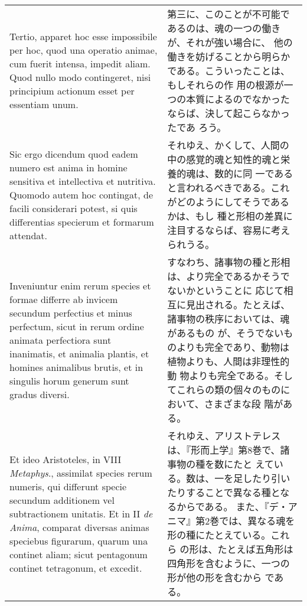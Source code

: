 \documentclass[paper=a4paper,fontsize=10pt,jafontsize=9pt,titlepage]{jlreq}
\begin{document}
\begin{longtable}{p{21em}p{21em}}
\\

Tertio, apparet hoc esse impossibile per hoc, quod una operatio
animae, cum fuerit intensa, impedit aliam. Quod nullo modo
contingeret, nisi principium actionum esset per essentiam unum.

&

第三に、このことが不可能であるのは、魂の一つの働きが、それが強い場合に、
他の働きを妨げることから明らかである。こういったことは、もしそれらの作
用の根源が一つの本質によるのでなかったならば、決して起こらなかったであ
ろう。
 
\\

 Sic ergo dicendum quod eadem numero est anima in homine sensitiva et
 intellectiva et nutritiva. Quomodo autem hoc contingat, de facili
 considerari potest, si quis differentias specierum et formarum
 attendat.

 &

それゆえ、かくして、人間の中の感覚的魂と知性的魂と栄養的魂は、数的に同
一であると言われるべきである。これがどのようにしてそうであるかは、もし
種と形相の差異に注目するならば、容易に考えられうる。
 
\\

 Inveniuntur enim rerum species et formae differre ab invicem secundum
 perfectius et minus perfectum, sicut in rerum ordine animata
 perfectiora sunt inanimatis, et animalia plantis, et homines
 animalibus brutis, et in singulis horum generum sunt gradus diversi.

&

すなわち、諸事物の種と形相は、より完全であるかそうでないかということに
応じて相互に見出される。たとえば、諸事物の秩序においては、魂があるもの
が、そうでないものよりも完全であり、動物は植物よりも、人間は非理性的動
物よりも完全である。そしてこれらの類の個々のものにおいて、さまざまな段
階がある。
 
\\

 Et ideo Aristoteles, in VIII {\itshape Metaphys}., assimilat species
 rerum numeris, qui differunt specie secundum additionem vel
 subtractionem unitatis. Et in II {\itshape de Anima}, comparat
 diversas animas speciebus figurarum, quarum una continet aliam; sicut
 pentagonum continet tetragonum, et excedit.

&

それゆえ、アリストテレスは、『形而上学』第8巻で、諸事物の種を数にたと
えている。数は、一を足したり引いたりすることで異なる種となるからである。
また、『デ・アニマ』第2巻では、異なる魂を形の種にたとえている。これら
の形は、たとえば五角形は四角形を含むように、一つの形が他の形を含むから
である。
 

\end{longtable}
\end{document}
